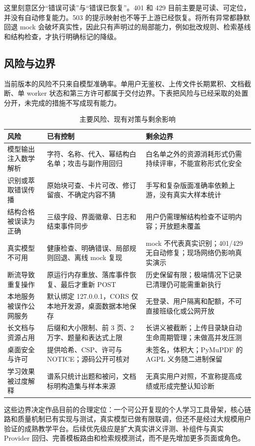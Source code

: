 这里刻意区分“错误可读”与“错误已恢复”。401 和 429 目前主要是可读、可定位，并没有自动修复能力。503 的提示映射也不等于上游已经恢复。将所有异常都静默回退 mock 会破坏真实性，因此只有声明过的局部能力，例如批改规则、检索基线和结构检查，才执行明确标记的降级。

\subsection{风险与边界}

当前版本的风险不只来自模型准确率。单用户无鉴权、上传文件长期累积、文档截断、单 worker 状态和第三方许可都属于交付边界。下表把风险与已经采取的处置分开，未完成的措施不写成现有能力。

\begin{table}[H]
\centering\footnotesize
\caption{主要风险、现有对策与剩余影响}
\begin{tabularx}{\textwidth}{@{}L{2.6cm}Y L{4.1cm}@{}}
\toprule
\textbf{风险} & \textbf{已有控制} & \textbf{剩余边界} \\
\midrule
模型输出注入数学解析 & 字符、名称、代入、幂结构白名单；攻击与副作用回归 & 白名单之外的资源消耗形式仍需持续评审，不能宣称形式化安全 \\
识别或萃取错误传播 & 原始块可查、卡片可改、修订留痕、不确定内容不猜 & 手写和复杂版面准确率依赖上游，没有真实大样本统计 \\
结构合格被误读为正确 & 三级字段、界面徽章、日志和结束事件同步 & 用户仍需理解结构检查不证明内容；开放题未覆盖 \\
真实模型不可用 & 健康检查、明确错误、局部规则回退、离线 mock 复现 & mock 不代表真实识别；401/429 无自动修复；现场网络仍影响真实演示 \\
断流导致重复操作 & 原运行内存重放、落库事件恢复、最后才重新 POST & 历史保留有限；极端情况下记录已清理仍可能需重新执行 \\
本地服务被误作公网服务 & 默认绑定 127.0.0.1，CORS 仅本地开发源，桌面数据本地保存 & 无登录、用户隔离和配额，不可直接班级化或公网开放 \\
长文档与资源占用 & 后缀和大小限制、前 3 页、2 万字、题量和表达式上限 & 长讲义被截断；上传目录缺自动生命周期管理；未做高并发压测 \\
桌面安全与许可 & 提供哈希、CSP、许可与 NOTICE；源码公开可核对 & 未签名，体积大；PyMuPDF 的 AGPL 义务随二进制保留 \\
学习效果被过度解释 & 谱系只统计出题和被问，文档标明构造集与样本来源 & 无真实用户对照，不宣称提高成绩或形成完整认知诊断 \\
\bottomrule
\end{tabularx}
\end{table}

这些边界决定作品目前的合理定位：一个可公开复现的个人学习工具骨架，核心链路和质量机制已有实现与测试，真实模型已做有限联调，但还不是经过大规模用户验证的成熟教学平台。后续优先级应是扩大真实讲义评测、补组件与真实 Provider 回归、完善模板路由和检索规模测试，而不是先增加更多页面或角色。
